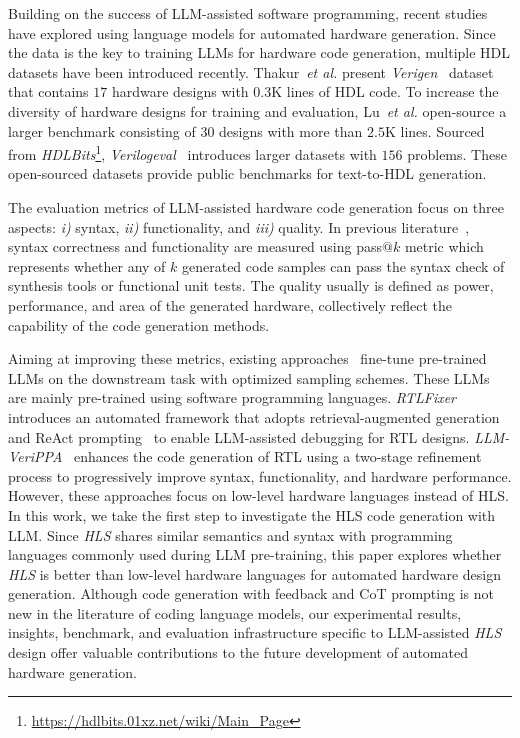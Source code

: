 Building on the success of LLM-assisted software programming, 
recent studies have explored using language models for automated hardware generation.
Since the data is the key to training LLMs for hardware code generation,
multiple HDL datasets have been introduced recently.
Thakur~\textit{et al.} present \textit{Verigen}~\cite{thakur2023verigen} dataset that contains $17$ hardware designs with $0.3$K lines of HDL code.
To increase the diversity of hardware designs for training and evaluation,
Lu~\textit{et al.} open-source a larger benchmark consisting of $30$ designs with more than $2.5$K lines.
Sourced from \textit{HDLBits}\footnote{\url{https://hdlbits.01xz.net/wiki/Main_Page}},
\textit{Verilogeval}~\cite{liu2023verilogeval} introduces larger datasets with $156$ problems.
These open-sourced datasets provide public benchmarks for text-to-HDL generation.

The evaluation metrics of LLM-assisted hardware code generation focus on three aspects: \textit{i)} syntax, \textit{ii)} functionality, and \textit{iii)} quality.
In previous literature~\cite{chen2021evaluating,liu2023verilogeval}, syntax correctness and functionality are measured using pass$@k$ metric which represents whether any of $k$ generated code samples can pass the syntax check of synthesis tools or functional unit tests.
The quality usually is defined as power, performance, and area of the generated hardware, collectively reflect the capability of the code generation methods.

Aiming at improving these metrics,
existing approaches~\cite{thakur2023verigen, lu2024rtllm, liu2023verilogeval} fine-tune pre-trained LLMs on the downstream task with optimized sampling schemes. 
These LLMs are mainly pre-trained using software programming languages.
\textit{RTLFixer}~\cite{tsai2023rtlfixer} introduces an automated framework that adopts retrieval-augmented generation~\cite{lewis2020retrieval} and ReAct prompting~\cite{yao2022react} to enable LLM-assisted debugging for RTL designs.
\textit{LLM-VeriPPA}~\cite{llm-verippa} enhances the code generation of RTL using a two-stage refinement process to progressively improve syntax, functionality, and hardware performance.
However, these approaches focus on low-level hardware languages instead of HLS. In this work, we take the first step to investigate the HLS code generation with LLM. 
Since \textit{HLS} shares similar semantics and syntax with programming languages commonly used during LLM pre-training,
this paper explores whether \textit{HLS} is better than low-level hardware languages for automated hardware design generation.
Although code generation with feedback and CoT prompting is not new in the literature of coding language models,
our experimental results, insights, benchmark, and evaluation infrastructure specific to LLM-assisted \textit{HLS} design offer valuable contributions to the future development of automated hardware generation. 

